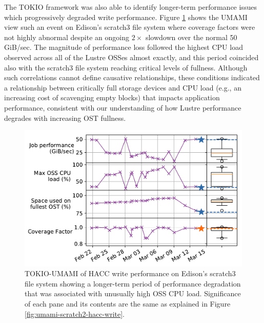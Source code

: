 The TOKIO framework was also able to identify longer-term performance issues which progressively degraded write performance.
Figure \ref{fig:umami-scratch3-hacc-write-long-term} shows the UMAMI view such an event on Edison's scratch3 file system where coverage factors were not highly abnormal despite an ongoing $2\times$ slowdown over the normal 50 GiB/sec.
The magnitude of performance loss followed the highest CPU load observed across all of the Lustre OSSes almost exactly, and this period coincided also with the scratch3 file system reaching critical levels of fullness.
Although such correlations cannot define causative relationships, these conditions indicated a relationship between critically full storage devices and CPU load (e.g., an increasing cost of scavenging empty blocks) that impacts application performance, consistent with our understanding of how Lustre performance degrades with increasing OST fullness.
 
\begin{figure}[t]
    \centering
    \includegraphics[width=1.0\columnwidth]{figs/umami-scratch3-hacc-write-long-term.pdf}
    \caption{TOKIO-UMAMI of HACC write performance on Edison's scratch3 file system showing a longer-term period of performance degradation that was associated with unusually high OSS CPU load.
    Significance of each pane and its contents are the same as explained in Figure \ref{fig:umami-scratch2-hacc-write}.}
    \label{fig:umami-scratch3-hacc-write-long-term}
\end{figure}


